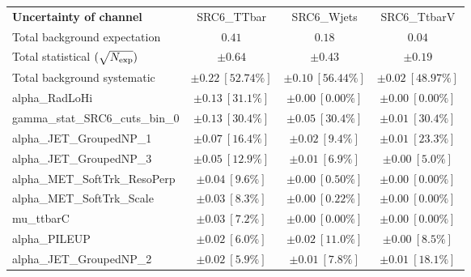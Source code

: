 
\begin{sidewaystable}
\begin{center}
\setlength{\tabcolsep}{0.0pc}
\begin{tabular*}{\textwidth}{@{\extracolsep{\fill}}lccc}
\noalign{\smallskip}\hline\noalign{\smallskip}
{\bf Uncertainty of channel}                                    & SRC6\_TTbar            & SRC6\_Wjets            & SRC6\_TtbarV            \\
\noalign{\smallskip}\hline\noalign{\smallskip}
Total background expectation             &  $0.41$        &  $0.18$        &  $0.04$       \\
\noalign{\smallskip}\hline\noalign{\smallskip}
Total statistical $(\sqrt{N_{\rm exp}})$              & $\pm 0.64$        & $\pm 0.43$        & $\pm 0.19$       \\
Total background systematic               & $\pm 0.22\ [52.74\%] $        & $\pm 0.10\ [56.44\%] $        & $\pm 0.02\ [48.97\%] $             \\
\noalign{\smallskip}\hline\noalign{\smallskip}
\noalign{\smallskip}\hline\noalign{\smallskip}
alpha\_RadLoHi         & $\pm 0.13\ [31.1\%] $          & $\pm 0.00\ [0.00\%] $          & $\pm 0.00\ [0.00\%] $       \\
gamma\_stat\_SRC6\_cuts\_bin\_0         & $\pm 0.13\ [30.4\%] $          & $\pm 0.05\ [30.4\%] $          & $\pm 0.01\ [30.4\%] $       \\
alpha\_JET\_GroupedNP\_1         & $\pm 0.07\ [16.4\%] $          & $\pm 0.02\ [9.4\%] $          & $\pm 0.01\ [23.3\%] $       \\
alpha\_JET\_GroupedNP\_3         & $\pm 0.05\ [12.9\%] $          & $\pm 0.01\ [6.9\%] $          & $\pm 0.00\ [5.0\%] $       \\
alpha\_MET\_SoftTrk\_ResoPerp         & $\pm 0.04\ [9.6\%] $          & $\pm 0.00\ [0.50\%] $          & $\pm 0.00\ [0.00\%] $       \\
alpha\_MET\_SoftTrk\_Scale         & $\pm 0.03\ [8.3\%] $          & $\pm 0.00\ [0.22\%] $          & $\pm 0.00\ [0.00\%] $       \\
mu\_ttbarC         & $\pm 0.03\ [7.2\%] $          & $\pm 0.00\ [0.00\%] $          & $\pm 0.00\ [0.00\%] $       \\
alpha\_PILEUP         & $\pm 0.02\ [6.0\%] $          & $\pm 0.02\ [11.0\%] $          & $\pm 0.00\ [8.5\%] $       \\
alpha\_JET\_GroupedNP\_2         & $\pm 0.02\ [5.9\%] $          & $\pm 0.01\ [7.8\%] $          & $\pm 0.01\ [18.1\%] $       \\

\end{tabular*}
\end{center}
\end{sidewaystable}
